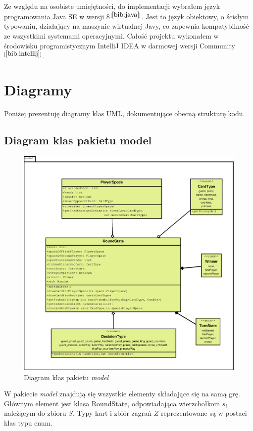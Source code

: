 Ze względu na osobiste umiejętności, do implementacji wybrałem język programowania Java SE w wersji 8$^{[\ref{bib:java}]}$. Jest to język obiektowy, o ścisłym typowaniu, działający na maszynie wirtualnej Javy, co zapewnia kompatybilność ze wszystkimi systemami operacyjnymi. Całość projektu wykonałem w środowisku programistycznym IntelliJ IDEA w darmowej wersji Community$^{[\ref{bib:intellij}]}$.

\section{Diagramy}
Poniżej prezentuję diagramy klas UML, dokumentujące obecną strukturę kodu. 
\subsection{Diagram klas pakietu model}

\begin{figure}[H]
	\centering
	\includegraphics[width=\textwidth]{Resources/diagramKlas_model.eps}
	\caption{Diagram klas pakietu \textit{model}} 
	\label{fig:diagramKlasModel}
\end{figure}

W pakiecie \textit{model} znajdują się wszystkie elementy składające się na samą grę. Głównym element jest klasa RoundState, odpowiadająca wierzchołkom $s_i$ należącym do zbioru $S$. Typy kart i zbiór zagrań $Z$ reprezentowane są w postaci klas typu enum.

